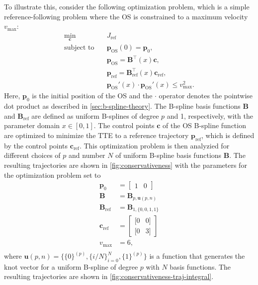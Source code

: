 To illustrate this, consider the following optimization problem, which is a simple reference-following problem where the OS is constrained to a maximum velocity $v_\text{max}$:
\begin{equation}\label{eq:conservativeness-optimization}
    \begin{aligned}
        \min_{\mathbf c} \quad & J_\text{ref} \\
        \text{subject to} \quad &\mathbf p_\text{OS}(0) = \mathbf p_0, \\
                    &\mathbf p_\text{OS} = \mathbf B^\top(x) \mathbf c, \\
                    &\mathbf p_\text{ref} = \mathbf B_\text{ref}^\top(x) \mathbf c_\text{ref}, \\
                    & \mathbf p_\text{OS}'(x) \cdot \mathbf p_\text{OS}'(x) \le v_\text{max}^2.
    \end{aligned}
\end{equation}
Here, $\mathbf p_0$ is the initial position of the OS and the $\cdot$ operator denotes the pointwise dot product as described in \cref{sec:b-spline-theory}. The B-spline basis functions $\mathbf B$ and $\mathbf B_\text{ref}$ are defined as uniform B-splines of degree $p$ and 1, respectively, with the parameter domain $x\in[0,1]$. The control points $\mathbf c$ of the OS B-spline function are optimized to minimize the TTE to a reference trajectory $\mathbf p_\text{ref}$, which is defined by the control points $\mathbf c_\text{ref}$.
This optimization problem is then analyzied for different choices of $p$ and number $N$ of uniform B-spline basis functions $\mathbf B$. The resulting trajectories are shown in \cref{fig:conservativeness} with the parameters for the optimization problem set to
\begin{equation}\label{eq:conservativeness-parameters}
    \begin{aligned}
        \mathbf p_0 &= \begin{bmatrix} 1 & 0 \end{bmatrix} \\
        \mathbf B &= \mathbf B_{p, \mathbf u(p,n)} \\
        \mathbf B_\text{ref} &= \mathbf B_{1,\{0, 0, 1, 1\}} \\
        \mathbf c_\text{ref} &= \begin{bmatrix}
            [0 & 0] \\
            [0 & 3]
        \end{bmatrix} \\
        v_\text{max} &= 6, \\
    \end{aligned}
\end{equation}
where $\mathbf u(p,n) = \{\{0\}^{(p)}, \{i/N\}_{i=0}^{N}, \{1\}^{(p)}\}$ is a function that generates the knot vector for a uniform B-spline of degree $p$ with $N$ basis functions. The resulting trajectories are shown in \cref{fig:conservativeness-traj-integral}.

